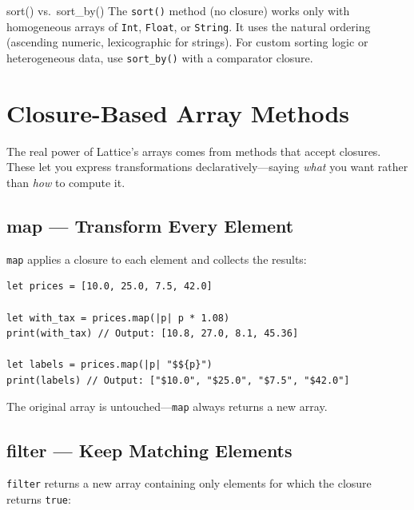 \begin{notebox}{sort() vs.\ sort\_by()}
The \lstinline|sort()| method (no closure) works only with homogeneous arrays of \lstinline|Int|, \lstinline|Float|, or \lstinline|String|. It uses the natural ordering (ascending numeric, lexicographic for strings). For custom sorting logic or heterogeneous data, use \lstinline|sort_by()| with a comparator closure.
\end{notebox}

\section{Closure-Based Array Methods}\label{sec:closure-methods}

The real power of Lattice's arrays comes from methods that accept closures. These let you express transformations declaratively---saying \emph{what} you want rather than \emph{how} to compute it.

\subsection{map --- Transform Every Element}\label{sec:array-map}

\lstinline|map| applies a closure to each element and collects the results:

\begin{lstlisting}[language=Lattice, caption={Mapping over arrays}]
let prices = [10.0, 25.0, 7.5, 42.0]

let with_tax = prices.map(|p| p * 1.08)
print(with_tax) // Output: [10.8, 27.0, 8.1, 45.36]

let labels = prices.map(|p| "$${p}")
print(labels) // Output: ["$10.0", "$25.0", "$7.5", "$42.0"]
\end{lstlisting}

The original array is untouched---\lstinline|map| always returns a new array.

\subsection{filter --- Keep Matching Elements}\label{sec:array-filter}

\lstinline|filter| returns a new array containing only elements for which the closure returns \lstinline|true|:

